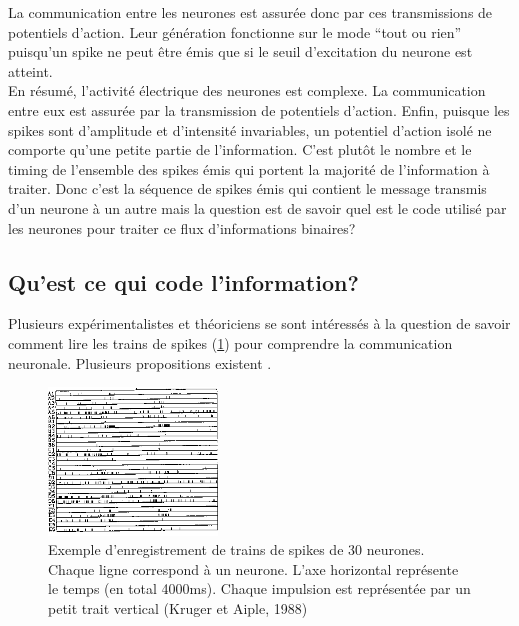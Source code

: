 La communication entre les neurones est assurée donc par ces transmissions de potentiels d'action. Leur génération fonctionne sur le mode ``tout ou rien'' puisqu'un spike ne peut être émis que si le seuil d'excitation du neurone est atteint. \\



En résumé, l'activité électrique des neurones est complexe. La communication entre eux est assurée par la transmission de potentiels d'action. Enfin, puisque les spikes sont d'amplitude et d'intensité invariables, un potentiel d'action isolé ne comporte qu'une petite partie de l'information. C'est plutôt le nombre et le timing de l'ensemble des spikes émis qui portent la majorité de l'information à traiter. Donc c'est la séquence de spikes émis qui contient le message transmis d'un neurone à un autre mais la question est de savoir quel est le code utilisé par les neurones pour traiter ce flux d'informations binaires?  \\  

\subsection{Qu'est ce qui code l'information?}

Plusieurs expérimentalistes et théoriciens se sont intéressés à la question de savoir comment lire les trains de spikes (\ref{train}) pour comprendre la communication neuronale. Plusieurs propositions existent \cite{Shadlen:1994, Rieke:1996, Borst:1999,  Gerstner:2002, Pouget:2003, Averbeck:2004, Cariani:2004}.\\


\begin{figure}[htbp]
\begin{center}
\includegraphics[width=0.4\textwidth]{figures/ch1_3_train}
\end{center}
\caption{Exemple d'enregistrement de trains de spikes de 30 neurones. Chaque ligne correspond à un neurone. L'axe horizontal représente le temps (en total 4000ms). Chaque impulsion est représentée par un petit trait vertical (Kruger et Aiple, 1988)}
\label{train}
\end{figure}

